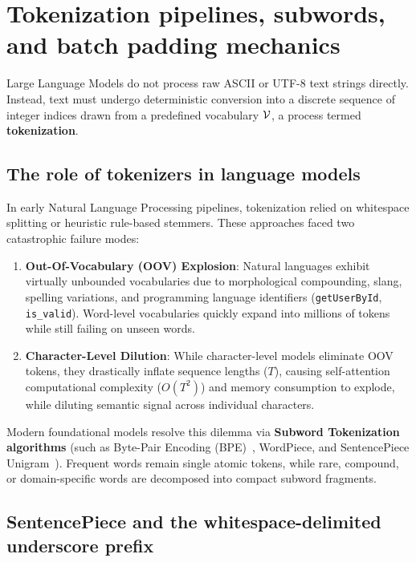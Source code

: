 \documentclass[../labs.tex]{subfiles}
\begin{document}
\section{Tokenization pipelines, subwords, and batch padding mechanics}
\label{sec:lab02_tokenization}

Large Language Models do not process raw ASCII or UTF-8 text strings directly. Instead, text must undergo deterministic conversion into a discrete sequence of integer indices drawn from a predefined vocabulary $\mathcal{V}$, a process termed \textbf{tokenization}.

\subsection{The role of tokenizers in language models}

In early Natural Language Processing pipelines, tokenization relied on whitespace splitting or heuristic rule-based stemmers. These approaches faced two catastrophic failure modes:
\begin{enumerate}
    \item \textbf{Out-Of-Vocabulary (OOV) Explosion}: Natural languages exhibit virtually unbounded vocabularies due to morphological compounding, slang, spelling variations, and programming language identifiers (\texttt{getUserById}, \texttt{is\_valid}). Word-level vocabularies quickly expand into millions of tokens while still failing on unseen words.
    \item \textbf{Character-Level Dilution}: While character-level models eliminate OOV tokens, they drastically inflate sequence lengths ($T$), causing self-attention computational complexity ($O(T^2)$) and memory consumption to explode, while diluting semantic signal across individual characters.
\end{enumerate}

Modern foundational models resolve this dilemma via \textbf{Subword Tokenization algorithms} (such as Byte-Pair Encoding (BPE)~\cite{sennrich2016}, WordPiece, and SentencePiece Unigram~\cite{kudo2018}). Frequent words remain single atomic tokens, while rare, compound, or domain-specific words are decomposed into compact subword fragments.

\subsection{SentencePiece and the whitespace-delimited underscore prefix}
\end{document}
